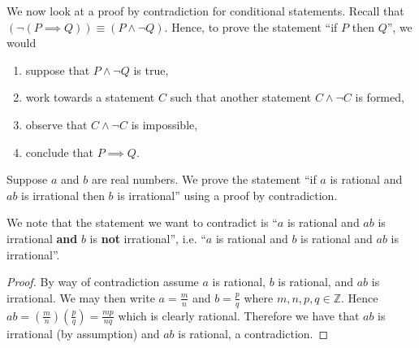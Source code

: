 We now look at a proof by contradiction for conditional statements. Recall that $(\lnot(P \implies Q)) \equiv (P \land \lnot Q)$. Hence, to prove the statement ``if $P$ then $Q$'', we would
\begin{enumerate}
    \item suppose that $P \land \lnot Q$ is true,
    \item work towards a statement $C$ such that another statement $C \land \lnot C$ is formed,
    \item observe that $C \land \lnot C$ is impossible,
    \item conclude that $P \implies Q$.
\end{enumerate}

\begin{example}
    Suppose $a$ and $b$ are real numbers. We prove the statement ``if $a$ is rational and $ab$ is irrational then $b$ is irrational'' using a proof by contradiction.
    
    We note that the statement we want to contradict is ``$a$ is rational and $ab$ is irrational \textbf{and} $b$ is \textbf{not} irrational'', i.e. ``$a$ is rational and $b$ is rational and $ab$ is irrational''.
    \begin{proof}
        By way of contradiction assume $a$ is rational, $b$ is rational, and $ab$ is irrational. We may then write $a = \frac mn$ and $b = \frac pq$ where $m, n, p, q \in \mathbb{Z}$. Hence $ab = \left(\frac mn\right)\left(\frac pq\right) = \frac{mp}{nq}$ which is clearly rational. Therefore we have that $ab$ is irrational (by assumption) and $ab$ is rational, a contradiction.
    \end{proof}
\end{example}

